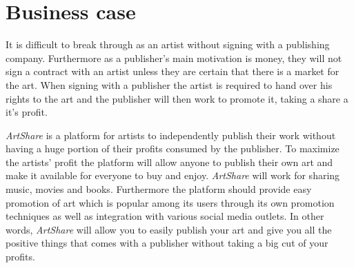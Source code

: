\documentclass[../report.tex]{subfiles}
\begin{document}
\section{Business case}
It is difficult to break through as an artist without signing with a publishing company. Furthermore as a publisher's main motivation is money, they will not sign a contract with an artist unless they are certain that there is a market for the art. When signing with a publisher the artist is required to hand over his rights to the art and the publisher will then work to promote it, taking a share a it's profit.



\noindent \textit{ArtShare} is a platform for artists to independently publish their work without having a huge portion of their profits consumed by the publisher. To maximize the artists' profit the platform will allow anyone to publish their own art and make it available for everyone to buy and enjoy. \textit{ArtShare} will work for sharing music, movies and books. Furthermore the platform should provide easy promotion of art which is popular among its users through its own promotion techniques as well as integration with various social media outlets. In other words, \textit{ArtShare} will allow you to easily publish your art and give you all the positive things that comes with a publisher without taking a big cut of your profits. 

\end{document}
